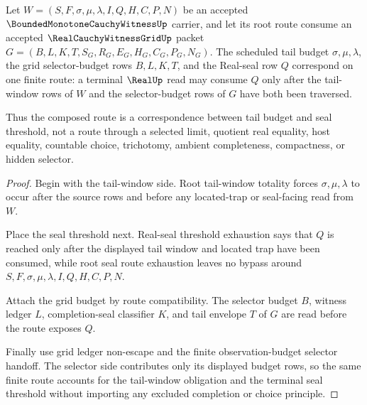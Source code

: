 \begin{theorem}
\label{thm:bounded-monotone-cauchy-witness-tail-budget-seal-correspondence}
Let $W=(S,F,\sigma,\mu,\lambda,I,Q,H,C,P,N)$ be an accepted $\BoundedMonotoneCauchyWitnessUp$ carrier, and let its root route consume an accepted $\RealCauchyWitnessGridUp$ packet $G=(B,L,K,T,S_G,R_G,E_G,H_G,C_G,P_G,N_G)$. The scheduled tail budget $\sigma,\mu,\lambda$, the grid selector-budget rows $B,L,K,T$, and the Real-seal row $Q$ correspond on one finite route: a terminal $\RealUp$ read may consume $Q$ only after the tail-window rows of $W$ and the selector-budget rows of $G$ have both been traversed.

Thus the composed route is a correspondence between tail budget and seal threshold, not a route through a selected limit, quotient real equality, host equality, countable choice, trichotomy, ambient completeness, compactness, or hidden selector.
\end{theorem}
\begin{proof}
Begin with the tail-window side. Root tail-window totality forces $\sigma,\mu,\lambda$ to occur after the source rows and before any located-trap or seal-facing read from $W$.

Place the seal threshold next. Real-seal threshold exhaustion says that $Q$ is reached only after the displayed tail window and located trap have been consumed, while root seal route exhaustion leaves no bypass around $S,F,\sigma,\mu,\lambda,I,Q,H,C,P,N$.

Attach the grid budget by route compatibility. The selector budget $B$, witness ledger $L$, completion-seal classifier $K$, and tail envelope $T$ of $G$ are read before the route exposes $Q$.

Finally use grid ledger non-escape and the finite observation-budget selector handoff. The selector side contributes only its displayed budget rows, so the same finite route accounts for the tail-window obligation and the terminal seal threshold without importing any excluded completion or choice principle.
\end{proof}

